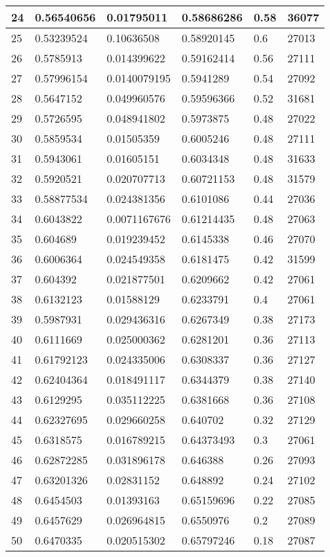 \begin{longtable}{|l|l|l|l|l|l|}
24 & 0.56540656 & 0.01795011 & 0.58686286 & 0.58 & 36077 \\ \hline 
25 & 0.53239524 & 0.10636508 & 0.58920145 & 0.6 & 27013 \\ \hline 
26 & 0.5785913 & 0.014399622 & 0.59162414 & 0.56 & 27111 \\ \hline 
27 & 0.57996154 & 0.0140079195 & 0.5941289 & 0.54 & 27092 \\ \hline 
28 & 0.5647152 & 0.049960576 & 0.59596366 & 0.52 & 31681 \\ \hline 
29 & 0.5726595 & 0.048941802 & 0.5973875 & 0.48 & 27022 \\ \hline 
30 & 0.5859534 & 0.01505359 & 0.6005246 & 0.48 & 27111 \\ \hline 
31 & 0.5943061 & 0.01605151 & 0.6034348 & 0.48 & 31633 \\ \hline 
32 & 0.5920521 & 0.020707713 & 0.60721153 & 0.48 & 31579 \\ \hline 
33 & 0.58877534 & 0.024381356 & 0.6101086 & 0.44 & 27036 \\ \hline 
34 & 0.6043822 & 0.0071167676 & 0.61214435 & 0.48 & 27063 \\ \hline 
35 & 0.604689 & 0.019239452 & 0.6145338 & 0.46 & 27070 \\ \hline 
36 & 0.6006364 & 0.024549358 & 0.6181475 & 0.42 & 31599 \\ \hline 
37 & 0.604392 & 0.021877501 & 0.6209662 & 0.42 & 27061 \\ \hline 
38 & 0.6132123 & 0.01588129 & 0.6233791 & 0.4 & 27061 \\ \hline 
39 & 0.5987931 & 0.029436316 & 0.6267349 & 0.38 & 27173 \\ \hline 
40 & 0.6111669 & 0.025000362 & 0.6281201 & 0.36 & 27113 \\ \hline 
41 & 0.61792123 & 0.024335006 & 0.6308337 & 0.36 & 27127 \\ \hline 
42 & 0.62404364 & 0.018491117 & 0.6344379 & 0.38 & 27140 \\ \hline 
43 & 0.6129295 & 0.035112225 & 0.6381668 & 0.36 & 27108 \\ \hline 
44 & 0.62327695 & 0.029660258 & 0.640702 & 0.32 & 27129 \\ \hline 
45 & 0.6318575 & 0.016789215 & 0.64373493 & 0.3 & 27061 \\ \hline 
46 & 0.62872285 & 0.031896178 & 0.646388 & 0.26 & 27093 \\ \hline 
47 & 0.63201326 & 0.02831152 & 0.648892 & 0.24 & 27102 \\ \hline 
48 & 0.6454503 & 0.01393163 & 0.65159696 & 0.22 & 27085 \\ \hline 
49 & 0.6457629 & 0.026964815 & 0.6550976 & 0.2 & 27089 \\ \hline 
50 & 0.6470335 & 0.020515302 & 0.65797246 & 0.18 & 27087 \\ \hline 
\end{longtable}